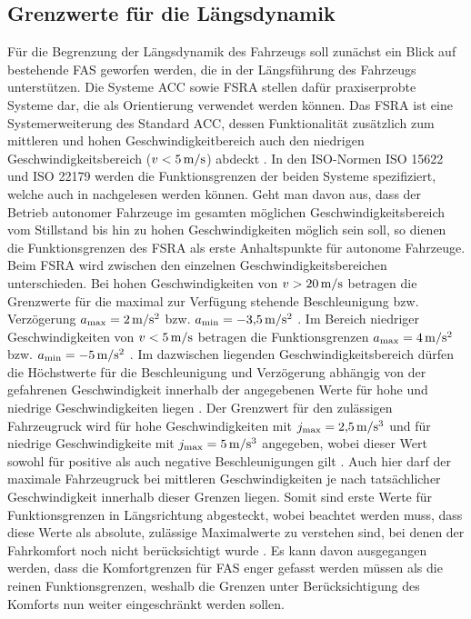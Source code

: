 \subsection{Grenzwerte für die Längsdynamik} \label{subsec:längsdynamik}
Für die Begrenzung der Längsdynamik des Fahrzeugs soll zunächst ein Blick auf bestehende \gls{FAS} geworfen werden, die  in der Längsführung des Fahrzeugs unterstützen. Die Systeme \gls{ACC} sowie \gls{FSRA} stellen dafür praxiserprobte Systeme dar, die als Orientierung verwendet werden können. Das \gls{FSRA} ist eine Systemerweiterung des Standard \gls{ACC}, dessen Funktionalität zusätzlich zum mittleren und hohen Geschwindigkeitbereich auch den niedrigen Geschwindigkeitsbereich ($v < 5\,\mathrm{m/s}$) abdeckt \cite{Winner.2012}. In den ISO-Normen ISO 15622 \cite{ISO.15622} und ISO 22179 \cite{ISO.22179} werden die Funktionsgrenzen der beiden Systeme spezifiziert, welche auch in \cite{Winner.2012} nachgelesen werden können. Geht man davon aus, dass der Betrieb autonomer Fahrzeuge im gesamten möglichen Geschwindigkeitsbereich vom Stillstand bis hin zu hohen Geschwindigkeiten möglich sein soll, so dienen die Funktionsgrenzen des \gls{FSRA} als erste Anhaltspunkte für autonome Fahrzeuge. Beim \gls{FSRA} wird zwischen den einzelnen Geschwindigkeitsbereichen unterschieden. Bei hohen Geschwindigkeiten von $v>20\,\mathrm{m/s}$ betragen die Grenzwerte für die maximal zur Verfügung stehende Beschleunigung bzw. Verzögerung $a_{\textrm{max}} = 2\,\mathrm{m/s^2}$ bzw. $a_{\textrm{min}} = -3{,}5\,\mathrm{m/s^2}$ \cite{Winner.2012}. Im Bereich niedriger Geschwindigkeiten von $v < 5\,\mathrm{m/s}$ betragen die Funktionsgrenzen $a_{\textrm{max}} = 4\,\mathrm{m/s^2}$ bzw. $a_{\textrm{min}} = -5\,\mathrm{m/s^2}$ \cite{Winner.2012}. Im dazwischen liegenden Geschwindigkeitsbereich dürfen die Höchstwerte für die Beschleunigung und Verzögerung abhängig von der gefahrenen Geschwindigkeit innerhalb der angegebenen Werte für hohe und niedrige Geschwindigkeiten liegen \cite{Winner.2012}. Der Grenzwert für den zulässigen Fahrzeugruck wird für hohe Geschwindigkeiten mit $j_{\textrm{max}} = 2{,}5\,\mathrm{m/s^3}$ und für niedrige Geschwindigkeite mit $j_{\textrm{max}} = 5\,\mathrm{m/s^3}$ angegeben, wobei dieser Wert sowohl für positive als auch negative Beschleunigungen gilt \cite{Winner.2012}. Auch hier darf der maximale Fahrzeugruck bei mittleren Geschwindigkeiten je nach tatsächlicher Geschwindigkeit innerhalb dieser Grenzen liegen. Somit sind erste Werte für Funktionsgrenzen in Längsrichtung abgesteckt, wobei beachtet werden muss, dass diese Werte als absolute, zulässige Maximalwerte zu verstehen sind, bei denen der Fahrkomfort noch nicht berücksichtigt wurde \cite{Festner.2019}. Es kann davon ausgegangen werden, dass die Komfortgrenzen für \gls{FAS} enger gefasst werden müssen als die reinen Funktionsgrenzen, weshalb die Grenzen unter Berücksichtigung des Komforts nun weiter eingeschränkt werden sollen.

